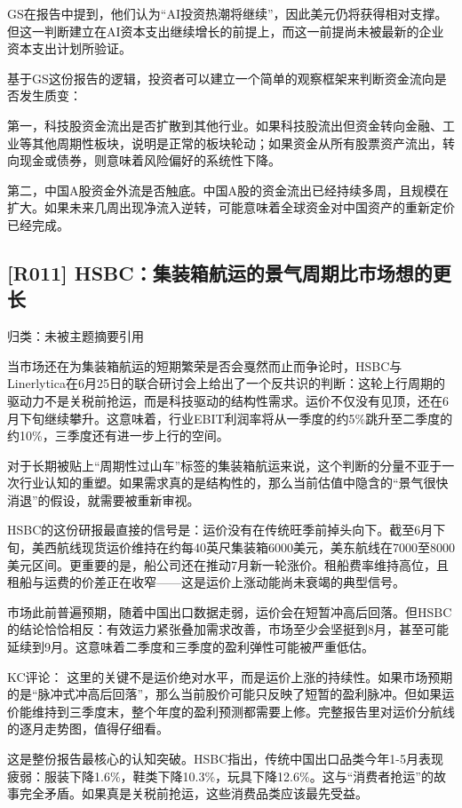 \documentclass[11pt]{ctexart}
\begin{document}
GS在报告中提到，他们认为“AI投资热潮将继续”，因此美元仍将获得相对支撑。但这一判断建立在AI资本支出继续增长的前提上，而这一前提尚未被最新的企业资本支出计划所验证。

基于GS这份报告的逻辑，投资者可以建立一个简单的观察框架来判断资金流向是否发生质变：

第一，科技股资金流出是否扩散到其他行业。如果科技股流出但资金转向金融、工业等其他周期性板块，说明是正常的板块轮动；如果资金从所有股票资产流出，转向现金或债券，则意味着风险偏好的系统性下降。

第二，中国A股资金外流是否触底。中国A股的资金流出已经持续多周，且规模在扩大。如果未来几周出现净流入逆转，可能意味着全球资金对中国资产的重新定价已经完成。

\subsection{[R011] HSBC：集装箱航运的景气周期比市场想的更长}
{\small\color{refgray}归类：未被主题摘要引用}

当市场还在为集装箱航运的短期繁荣是否会戛然而止而争论时，HSBC与Linerlytica在6月25日的联合研讨会上给出了一个反共识的判断：这轮上行周期的驱动力不是关税前抢运，而是科技驱动的结构性需求。运价不仅没有见顶，还在6月下旬继续攀升。这意味着，行业EBIT利润率将从一季度的约5\%跳升至二季度的约10\%，三季度还有进一步上行的空间。

对于长期被贴上“周期性过山车”标签的集装箱航运来说，这个判断的分量不亚于一次行业认知的重塑。如果需求真的是结构性的，那么当前估值中隐含的“景气很快消退”的假设，就需要被重新审视。

HSBC的这份研报最直接的信号是：运价没有在传统旺季前掉头向下。截至6月下旬，美西航线现货运价维持在约每40英尺集装箱6000美元，美东航线在7000至8000美元区间。更重要的是，船公司还在推动7月新一轮涨价。租船费率维持高位，且租船与运费的价差正在收窄——这是运价上涨动能尚未衰竭的典型信号。

市场此前普遍预期，随着中国出口数据走弱，运价会在短暂冲高后回落。但HSBC的结论恰恰相反：有效运力紧张叠加需求改善，市场至少会坚挺到8月，甚至可能延续到9月。这意味着二季度和三季度的盈利弹性可能被严重低估。

KC评论： 这里的关键不是运价绝对水平，而是运价上涨的持续性。如果市场预期的是“脉冲式冲高后回落”，那么当前股价可能只反映了短暂的盈利脉冲。但如果运价能维持到三季度末，整个年度的盈利预测都需要上修。完整报告里对运价分航线的逐月走势图，值得仔细看。

这是整份报告最核心的认知突破。HSBC指出，传统中国出口品类今年1-5月表现疲弱：服装下降1.6\%，鞋类下降10.3\%，玩具下降12.6\%。这与“消费者抢运”的故事完全矛盾。如果真是关税前抢运，这些消费品类应该最先受益。
\end{document}
